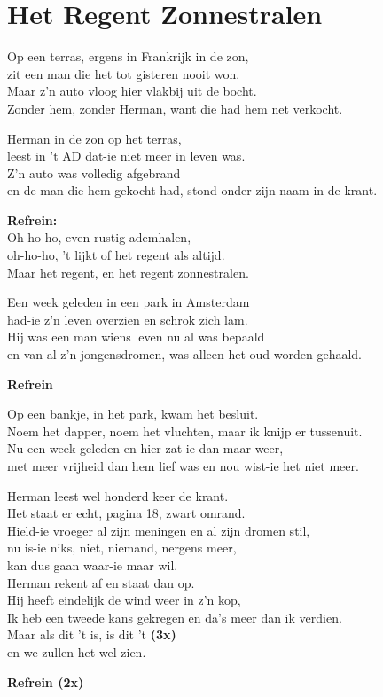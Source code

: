 \section{Het Regent Zonnestralen}
Op een terras, ergens in Frankrijk in de zon,\\
zit een man die het tot gisteren nooit won.\\
Maar z'n auto vloog hier vlakbij uit de bocht.\\
Zonder hem, zonder Herman, want die had hem net verkocht.

Herman in de zon op het terras,\\
leest in 't AD dat-ie niet meer in leven was.\\
Z'n auto was volledig afgebrand\\
en de man die hem gekocht had, stond onder zijn naam in de krant.

\textbf{Refrein:}\\
Oh-ho-ho, even rustig ademhalen,\\
oh-ho-ho, 't lijkt of het regent als altijd.\\
Maar het regent, en het regent zonnestralen.

Een week geleden in een park in Amsterdam\\
had-ie z'n leven overzien en schrok zich lam.\\
Hij was een man wiens leven nu al was bepaald\\
en van al z'n jongensdromen, was alleen het oud worden gehaald.

\textbf{Refrein}

Op een bankje, in het park, kwam het besluit.\\
Noem het dapper, noem het vluchten, maar ik knijp er tussenuit.\\
Nu een week geleden en hier zat ie dan maar weer,\\
met meer vrijheid dan hem lief was en nou wist-ie het niet meer.

Herman leest wel honderd keer de krant.\\
Het staat er echt, pagina 18, zwart omrand.\\
Hield-ie vroeger al zijn meningen en al zijn dromen stil,\\
nu is-ie niks, niet, niemand, nergens meer,\\
kan dus gaan waar-ie maar wil.\\
Herman rekent af en staat dan op.\\
Hij heeft eindelijk de wind weer in z'n kop,\\
Ik heb een tweede kans gekregen en da's meer dan ik verdien.\\
Maar als dit 't is, is dit 't \textbf{(3x)}\\
en we zullen het wel zien.

\textbf{Refrein (2x)}

